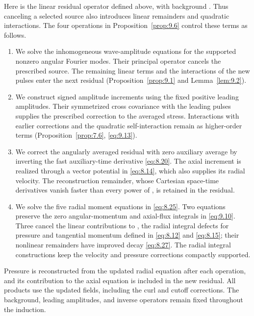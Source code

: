 %
Here  is the linear residual operator defined above, with background
. Thus canceling a selected source also introduces linear remainders and quadratic interactions. The four
operations in Proposition~\ref{prop:9.6} control these terms as follows.
\begin{enumerate}[label=\arabic*.,leftmargin=*]
\item We solve the inhomogeneous wave-amplitude equations for the supported nonzero
angular Fourier modes. Their principal operator cancels the prescribed source. The
remaining linear terms and the interactions of the new pulses enter the next residual
(Proposition~\ref{prop:9.1} and Lemma~\ref{lem:9.2}).
\item We construct signed amplitude increments using the fixed positive leading amplitudes.
Their symmetrized cross covariance with the leading pulses supplies the prescribed
correction to the averaged stress. Interactions with earlier corrections and the quadratic
self-interaction remain as higher-order terms (Proposition~\ref{prop:7.6}, \eqref{eq:9.13}).
\item We correct the angularly averaged residual with zero auxiliary average by inverting the
fast auxiliary-time derivative \eqref{eq:8.20}. The axial increment is realized through a vector
potential in \eqref{eq:8.14}, which also supplies its radial velocity. The reconstruction remainder,
whose Cartesian space-time derivatives vanish faster than every power of
, is retained in the residual.
\item We solve the five radial moment equations in \eqref{eq:8.25}. Two equations preserve the zero
angular-momentum and axial-flux integrals in \eqref{eq:9.10}. Three cancel the linear contributions
to , the radial integral defects for pressure and tangential momentum defined
in \eqref{eq:8.12} and \eqref{eq:8.15}; their nonlinear remainders have improved decay \eqref{eq:8.27}. The radial
integral constructions keep the velocity and pressure corrections compactly supported.
\end{enumerate}
Pressure is reconstructed from the updated radial equation after each operation, and its contribution
to the axial equation is included in the new residual. All products use the updated
fields, including the curl and cutoff corrections. The background, leading amplitudes, and
inverse operators remain fixed throughout the induction.

